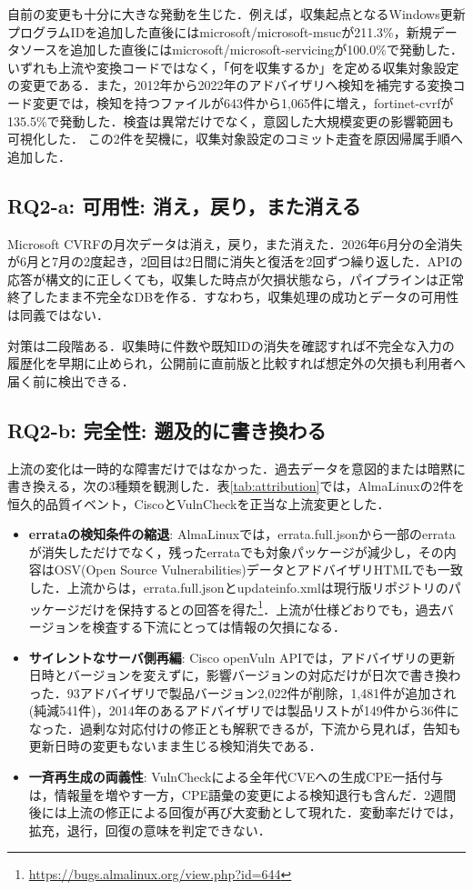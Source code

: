 \documentclass{css}
\begin{document}
自前の変更も十分に大きな発動を生じた．例えば，収集起点となるWindows更新プログラムIDを追加した直後にはmicrosoft/microsoft-msucが211.3\%，新規データソースを追加した直後にはmicrosoft/microsoft-servicingが100.0\%で発動した．いずれも上流や変換コードではなく，「何を収集するか」を定める収集対象設定の変更である．また，2012年から2022年のアドバイザリへ検知を補完する変換コード変更では，検知を持つファイルが643件から1,065件に増え，fortinet-cvrfが135.5\%で発動した．検査は異常だけでなく，意図した大規模変更の影響範囲も可視化した．
この2件を契機に，収集対象設定のコミット走査を原因帰属手順へ追加した．

\subsection{RQ2-a: 可用性: 消え，戻り，また消える}
\label{sec:avail}

Microsoft CVRFの月次データは消え，戻り，また消えた．2026年6月分の全消失が6月と7月の2度起き，2回目は2日間に消失と復活を2回ずつ繰り返した．APIの応答が構文的に正しくても，収集した時点が欠損状態なら，パイプラインは正常終了したまま不完全なDBを作る．すなわち，収集処理の成功とデータの可用性は同義ではない．

対策は二段階ある．収集時に件数や既知IDの消失を確認すれば不完全な入力の履歴化を早期に止められ，公開前に直前版と比較すれば想定外の欠損も利用者へ届く前に検出できる．

\subsection{RQ2-b: 完全性: 遡及的に書き換わる}
\label{sec:integrity}

上流の変化は一時的な障害だけではなかった．過去データを意図的または暗黙に書き換える，次の3種類を観測した．表\ref{tab:attribution}では，AlmaLinuxの2件を恒久的品質イベント，CiscoとVulnCheckを正当な上流変更とした．

\begin{itemize}
\item \textbf{errataの検知条件の縮退}:
AlmaLinuxでは，errata.full.jsonから一部のerrataが消失しただけでなく，残ったerrataでも対象パッケージが減少し，その内容はOSV(Open Source Vulnerabilities)データとアドバイザリHTMLでも一致した．上流からは，errata.full.jsonとupdateinfo.xmlは現行版リポジトリのパッケージだけを保持するとの回答を得た\footnote{\url{https://bugs.almalinux.org/view.php?id=644}}．上流が仕様どおりでも，過去バージョンを検査する下流にとっては情報の欠損になる．
\item \textbf{サイレントなサーバ側再編}:
Cisco openVuln APIでは，アドバイザリの更新日時とバージョンを変えずに，影響バージョンの対応だけが日次で書き換わった．93アドバイザリで製品バージョン2,022件が削除，1,481件が追加され(純減541件)，2014年のあるアドバイザリでは製品リストが149件から36件になった．過剰な対応付けの修正とも解釈できるが，下流から見れば，告知も更新日時の変更もないまま生じる検知消失である．
\item \textbf{一斉再生成の両義性}:
VulnCheckによる全年代CVEへの生成CPE一括付与は，情報量を増やす一方，CPE語彙の変更による検知退行も含んだ．2週間後には上流の修正による回復が再び大変動として現れた．変動率だけでは，拡充，退行，回復の意味を判定できない．
\end{itemize}
\end{document}
